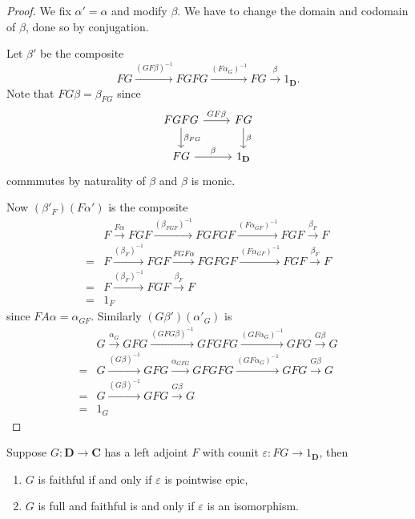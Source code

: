 \documentclass[a4paper]{article}
\renewcommand{\c}[1]{\mathbf{#1}}
\begin{document}
\begin{proof}
  We fix \(\alpha' = \alpha\) and modify \(\beta\). We have to change the domain and codomain of \(\beta\), done so by conjugation.

  Let \(\beta'\) be the composite
  \[
    FG \xrightarrow{(GF\beta)^{-1}} FGFG \xrightarrow{(F\alpha_G)^{-1}} FG \xrightarrow{\beta} 1_{\c D}.
  \]
  Note that \(FG\beta = \beta_{FG}\) since
  \[
    \begin{tikzcd}
      FGFG \ar[r, "GF\beta"] \ar[d, "\beta_{FG}"] & FG \ar[d, "\beta"] \\
      FG \ar[r, "\beta"] & 1_{\c D}
    \end{tikzcd}
  \]
  commmutes by naturality of \(\beta\) and \(\beta\) is monic.

  Now \((\beta'_F)(F\alpha')\) is the composite
   \begin{align*}
     &F \xrightarrow{F\alpha} FGF \xrightarrow{(\beta_{FGF})^{-1}} FGFGF \xrightarrow{(F\alpha_{GF})^{-1}} FGF \xrightarrow{\beta_F} F \\
     =& F \xrightarrow{(\beta_F)^{-1}} FGF \xrightarrow{FGF\alpha} FGFGF \xrightarrow{(F\alpha_{GF})^{-1}} FGF \xrightarrow{\beta_F} F \\
     =& F \xrightarrow{(\beta_F)^{-1}} FGF \xrightarrow{\beta_F} F \\
     =& 1_F
   \end{align*}
  since \(FA \alpha = \alpha_{GF}\). Similarly \((G\beta')(\alpha'_G)\) is
  \begin{align*}
    &G \xrightarrow{\alpha_G} GFG \xrightarrow{(GFG\beta)^{-1}} GFGFG \xrightarrow{(GF\alpha_G)^{-1}} GFG \xrightarrow{G\beta} G \\
    =& G \xrightarrow{(G\beta)^{-1}} GFG \xrightarrow{\alpha_{GFG}} GFGFG \xrightarrow{(GF\alpha_G)^{-1}} GFG \xrightarrow{G\beta} G \\
    =& G \xrightarrow{(G\beta)^{-1}} GFG \xrightarrow{G\beta} G \\
    =& 1_G
  \end{align*}
\end{proof}

\begin{lemma}
  Suppose \(G: \c D \to \c C\) has a left adjoint \(F\) with counit \(\varepsilon: FG \to 1_{\c D}\), then
  \begin{enumerate}
  \item \(G\) is faithful if and only if \(\varepsilon\) is pointwise epic,
  \item \(G\) is full and faithful is and only if \(\varepsilon\) is an isomorphism.
  \end{enumerate}
\end{lemma}
\end{document}
